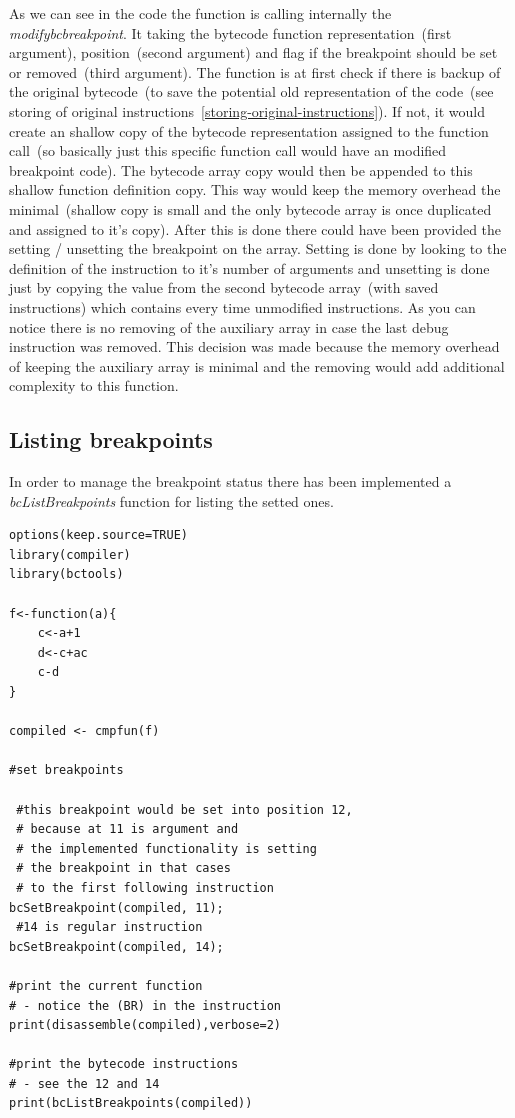 \documentclass[thesis=M,english]{FITthesis}[2018/10/20]
\begin{document}
As we can see in the code the function is calling internally the \textit{modifybcbreakpoint}. It taking the bytecode function representation~(first argument), position~(second argument) and flag if the breakpoint should be set or removed~(third argument). The function is at first check if there is backup of the original bytecode~(to save the potential old representation of the code~(see storing of original instructions~\ref{storing-original-instructions}). If not, it would create an shallow copy of the bytecode representation assigned to the function call~(so basically just this specific function call would have an modified breakpoint code). The bytecode array copy would then be appended to this shallow function definition copy. This way would keep the memory overhead the minimal~(shallow copy is small and the only bytecode array is once duplicated and assigned to it's copy). After this is done there could have been provided the setting / unsetting the breakpoint on the array. Setting is done by looking to the definition of the instruction to it's number of arguments and unsetting is done just by copying the value from the second bytecode array~(with saved instructions) which contains every time unmodified instructions. As you can notice there is no removing of the auxiliary array in case the last debug instruction was removed. This decision was made because the memory overhead of keeping the auxiliary array is minimal and the removing would add additional complexity to this function.

\subsection{Listing breakpoints}\label{listing-breakpoints}

In order to manage the breakpoint status there has been implemented a \textit{bcListBreakpoints} function for listing the setted ones.

\begin{lstlisting}
options(keep.source=TRUE)
library(compiler)
library(bctools)

f<-function(a){
    c<-a+1
    d<-c+ac
    c-d
}

compiled <- cmpfun(f)

#set breakpoints

 #this breakpoint would be set into position 12,
 # because at 11 is argument and 
 # the implemented functionality is setting 
 # the breakpoint in that cases 
 # to the first following instruction
bcSetBreakpoint(compiled, 11);
 #14 is regular instruction
bcSetBreakpoint(compiled, 14);

#print the current function 
# - notice the (BR) in the instruction
print(disassemble(compiled),verbose=2)

#print the bytecode instructions 
# - see the 12 and 14
print(bcListBreakpoints(compiled))
\end{lstlisting}
\end{document}
